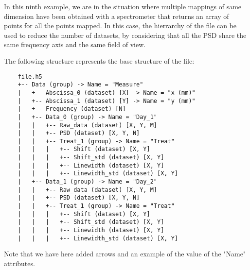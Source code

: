 In this ninth example, we are in the situation where multiple mappings of same dimension have been obtained with a spectrometer that returns an array of points for all the points mapped. In this case, the hierrarchy of the file can be used to reduce the number of datasets, by considering that all the PSD share the same frequency axis and the same field of view.

The following structure represents the base structure of the file:
\begin{verbatim}
    file.h5
    +-- Data (group) -> Name = "Measure"
    |   +-- Abscissa_0 (dataset) [X] -> Name = "x (mm)"
    |   +-- Abscissa_1 (dataset) [Y] -> Name = "y (mm)"
    |   +-- Frequency (dataset) [N]
    |   +-- Data_0 (group) -> Name = "Day_1"
    |   |   +-- Raw_data (dataset) [X, Y, M]
    |   |   +-- PSD (dataset) [X, Y, N]
    |   |   +-- Treat_1 (group) -> Name = "Treat"
    |   |   |   +-- Shift (dataset) [X, Y]
    |   |   |   +-- Shift_std (dataset) [X, Y]
    |   |   |   +-- Linewidth (dataset) [X, Y]
    |   |   |   +-- Linewidth_std (dataset) [X, Y]
    |   +-- Data_1 (group) -> Name = "Day_2"
    |   |   +-- Raw_data (dataset) [X, Y, M]
    |   |   +-- PSD (dataset) [X, Y, N]
    |   |   +-- Treat_1 (group) -> Name = "Treat"
    |   |   |   +-- Shift (dataset) [X, Y]
    |   |   |   +-- Shift_std (dataset) [X, Y]
    |   |   |   +-- Linewidth (dataset) [X, Y]
    |   |   |   +-- Linewidth_std (dataset) [X, Y]
\end{verbatim}
Note that we have here added arrows and an example of the value of the "Name" attributes.